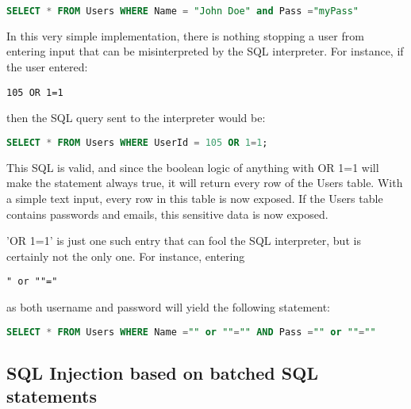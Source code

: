 \begin{lstlisting}[language = SQL]
SELECT * FROM Users WHERE Name = "John Doe" and Pass ="myPass"
\end{lstlisting} 

In this very simple implementation, there is nothing stopping a user from entering input that can be misinterpreted by the SQL interpreter. For instance, if the user entered:
\begin{verbatim}
105 OR 1=1
\end{verbatim}
then the SQL query sent to the interpreter would be:
\begin{lstlisting}[language = SQL]
SELECT * FROM Users WHERE UserId = 105 OR 1=1;
\end{lstlisting}
This SQL is valid, and since the boolean logic of anything with OR 1=1 will make the statement always true, it will return every row of the Users table. With a simple text input, every row in this table is now exposed. If the Users table contains passwords and emails, this sensitive data is now exposed.

'OR 1=1' is just one such entry that can fool the SQL interpreter, but is certainly not the only one. For instance, entering 
\begin{verbatim}
" or ""="
\end{verbatim}
as both username and password will yield the following statement:
\begin{lstlisting}[language = SQL]
SELECT * FROM Users WHERE Name ="" or ""="" AND Pass ="" or ""=""
\end{lstlisting}

\subsection{SQL Injection based on batched SQL statements}


